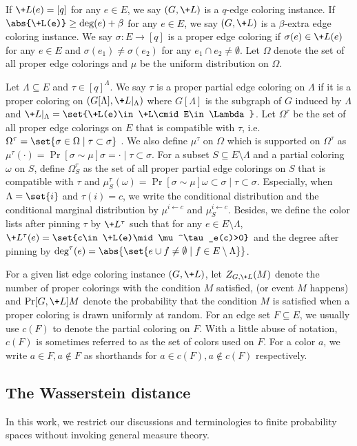 \documentclass[a4paper,11pt]{article}
\begin{document}
If $\+L(e)=[q]$ for any $e\in E$, we say $(G,\+L)$ is a $q$-edge coloring instance.  If $\abs{\+L(e)}\geq \deg(e)+\beta$ for any $e\in E$, we say $(G,\+L)$ is a $\beta$-extra edge coloring instance. We say $\sigma:E\rightarrow [q]$ is a proper edge coloring if $\sigma(e) \in \+L(e)$ for any $e\in E$ and $\sigma(e_1)\neq \sigma(e_2)$ for any $e_1\cap e_2 \neq \emptyset$. Let $\Omega$ denote the set of all proper edge colorings and $\mu$ be the uniform distribution on $\Omega$. 

Let $\Lambda\subseteq E$ and $\tau\in [q]^\Lambda$. We say $\tau$ is a proper partial edge coloring on $\Lambda$ if it is a proper coloring on $(G[\Lambda],\+L|_\Lambda)$ where $G[\Lambda]$ is the subgraph of $G$ induced by $\Lambda$ and $\+L|_{\Lambda}=\set{\+L(e)\in \+L\cmid E\in \Lambda}$. Let $\Omega^\tau$ be the set of all proper edge colorings on $E$ that is compatible with $\tau$, i.e. $\Omega^\tau = \set{\sigma \in \Omega\mid \tau \subset \sigma}$ . We also define $\mu^\tau$ on $\Omega$ which is supported on $\Omega^\tau$ as $\mu^\tau(\cdot) = \Pr[\sigma \sim \mu]{\sigma=\cdot \mid \tau \subset \sigma}$.
For a subset $S\subseteq E\setminus \Lambda$ and a partial coloring $\omega$ on $S$, define $\Omega^\tau_S$ as the set of all proper partial edge colorings on $S$ that is compatible with
$\tau$ and $\mu^\tau_S(\omega)=\Pr[\sigma\sim \mu]{\omega \subset \sigma \mid \tau \subset \sigma}$. Especially, when $\Lambda=\set{i}$ and $\tau(i)=c$, we write the conditional distribution and the conditional marginal distribution by $\mu^{i\leftarrow c}$ and $\mu^{i\leftarrow c}_S$. Besides, we define the color lists after pinning  $\tau$ by $\+L^\tau$ such that for any $e\in E\setminus\Lambda$, $\+L^\tau(e)=\set{c\in \+L(e)\mid \mu^\tau_e(c)>0}$ and the degree after pinning by $\deg^\tau(e) = \abs{\set{e\cup f \neq \emptyset\mid f \in E\setminus \Lambda}}$.

For a given list edge coloring instance $(G,\+L)$, let $Z_{G,\+L}(M)$ denote the number of proper colorings with the condition $M$ satisfied, (or event $M$ happens) and $\Pr[G,\+L]{M}$ denote the probability that the condition $M$ is satisfied when a proper coloring is drawn uniformly at random. For an edge set $F\subseteq E$, we usually use $c(F)$ to denote the partial coloring on $F$. With a little abuse of notation, $c(F)$ is sometimes referred to as the set of colors used on $F$.
For a color $a$, we write $a\in F, a\notin F$ as shorthands for $a\in c(F), a\notin c(F)$ respectively.

\subsection{The Wasserstein distance}
In this work, we restrict our discussions and terminologies to finite probability spaces without invoking general measure theory. 
\end{document}
